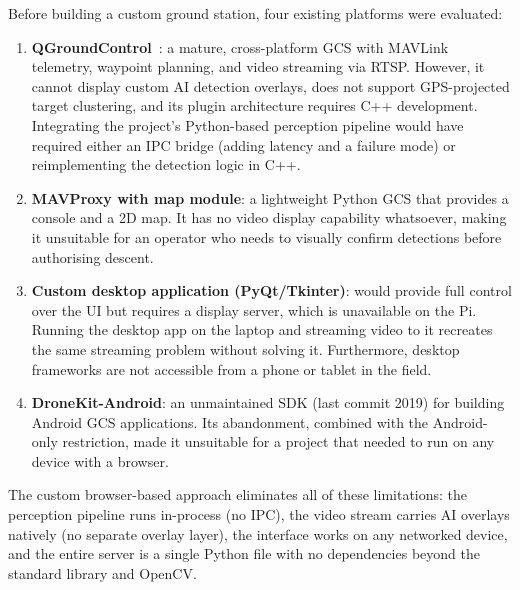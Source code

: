 Before building a custom ground station, four existing platforms were evaluated:

\begin{enumerate}
  \item \textbf{QGroundControl}~\cite{qgroundcontrol2020}: a mature, cross-platform GCS
        with MAVLink telemetry, waypoint planning, and video streaming via RTSP. However,
        it cannot display custom AI detection overlays, does not support GPS-projected
        target clustering, and its plugin architecture requires C++ development. Integrating
        the project's Python-based perception pipeline would have required either an IPC
        bridge (adding latency and a failure mode) or reimplementing the detection logic
        in C++.

  \item \textbf{MAVProxy with map module}: a lightweight Python GCS that provides a
        console and a 2D map. It has no video display capability whatsoever, making it
        unsuitable for an operator who needs to visually confirm detections before
        authorising descent.

  \item \textbf{Custom desktop application (PyQt/Tkinter)}: would provide full control
        over the UI but requires a display server, which is unavailable on the Pi. Running
        the desktop app on the laptop and streaming video to it recreates the same
        streaming problem without solving it. Furthermore, desktop frameworks are not
        accessible from a phone or tablet in the field.

  \item \textbf{DroneKit-Android}: an unmaintained SDK (last commit 2019) for building
        Android GCS applications. Its abandonment, combined with the Android-only
        restriction, made it unsuitable for a project that needed to run on any device
        with a browser.
\end{enumerate}

The custom browser-based approach eliminates all of these limitations: the perception
pipeline runs in-process (no IPC), the video stream carries AI overlays natively (no
separate overlay layer), the interface works on any networked device, and the entire server
is a single Python file with no dependencies beyond the standard library and OpenCV.
